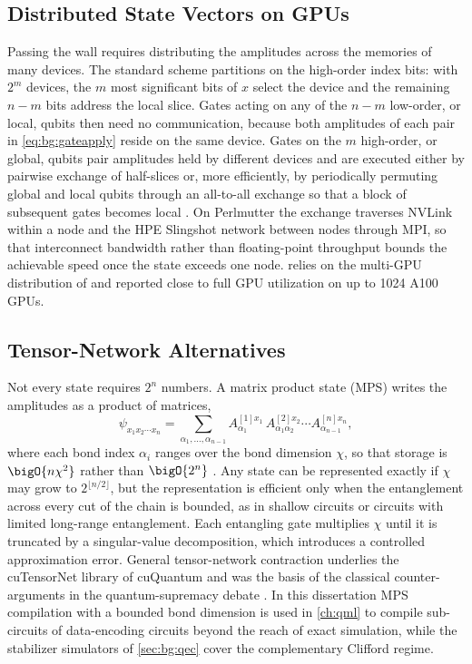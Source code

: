 \subsection{Distributed State Vectors on GPUs}

Passing the wall requires distributing the amplitudes across the memories of many devices. The standard scheme partitions on the high-order index bits: with $2^m$ devices, the $m$ most significant bits of $x$ select the device and the remaining $n-m$ bits address the local slice. Gates acting on any of the $n-m$ low-order, or local, qubits then need no communication, because both amplitudes of each pair in \cref{eq:bg:gateapply} reside on the same device. Gates on the $m$ high-order, or global, qubits pair amplitudes held by different devices and are executed either by pairwise exchange of half-slices or, more efficiently, by periodically permuting global and local qubits through an all-to-all exchange so that a block of subsequent gates becomes local \cite{bayraktar2023cuquantum}. On Perlmutter the exchange traverses NVLink within a node and the HPE Slingshot network between nodes through MPI, so that interconnect bandwidth rather than floating-point throughput bounds the achievable speed once the state exceeds one node. \qgear{} \cite{guo2025qgear} relies on the multi-GPU distribution of \cudaq{} and reported close to full GPU utilization on up to 1024 A100 GPUs.

\subsection{Tensor-Network Alternatives}

Not every state requires $2^n$ numbers. A matrix product state (MPS) writes the amplitudes as a product of matrices,
\begin{equation}\label{eq:bg:mps}
\psi_{x_1x_2\cdots x_n}=\sum_{\alpha_1,\dots,\alpha_{n-1}}A^{[1]x_1}_{\alpha_1}\,A^{[2]x_2}_{\alpha_1\alpha_2}\cdots A^{[n]x_n}_{\alpha_{n-1}},
\end{equation}
where each bond index $\alpha_i$ ranges over the bond dimension $\chi$, so that storage is $\bigO{n\chi^2}$ rather than $\bigO{2^n}$ \cite{perezgarcia2006mps}. Any state can be represented exactly if $\chi$ may grow to $2^{\lfloor n/2\rfloor}$, but the representation is efficient only when the entanglement across every cut of the chain is bounded, as in shallow circuits or circuits with limited long-range entanglement. Each entangling gate multiplies $\chi$ until it is truncated by a singular-value decomposition, which introduces a controlled approximation error. General tensor-network contraction underlies the cuTensorNet library of cuQuantum \cite{bayraktar2023cuquantum} and was the basis of the classical counter-arguments in the quantum-supremacy debate \cite{arute2019supremacy}. In this dissertation MPS compilation with a bounded bond dimension is used in \cref{ch:qml} to compile sub-circuits of data-encoding circuits beyond the reach of exact simulation, while the stabilizer simulators of \cref{sec:bg:qec} cover the complementary Clifford regime.

